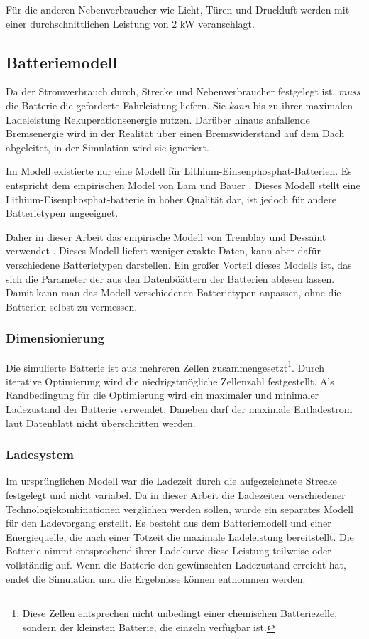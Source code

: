 Für die anderen Nebenverbraucher wie Licht, Türen und Druckluft werden mit einer durchschnittlichen Leistung von 2 kW veranschlagt.

\subsection{Batteriemodell}
Da der Stromverbrauch durch, Strecke und Nebenverbraucher festgelegt ist, \emph{muss} die Batterie die geforderte Fahrleistung liefern. Sie \emph{kann} bis zu ihrer maximalen Ladeleistung Rekuperationsenergie nutzen. Darüber hinaus anfallende Bremsenergie wird in der Realität über einen Bremswiderstand auf dem Dach abgeleitet, in der Simulation wird sie ignoriert.

Im Modell existierte nur eine Modell für Lithium-Einsenphosphat-Batterien. Es entspricht dem empirischen Model von Lam und Bauer \cite{lam2011practical}. Dieses Modell stellt eine Lithium-Eisenphosphat-batterie in hoher Qualität dar, ist jedoch für andere Batterietypen ungeeignet.

Daher in dieser Arbeit das empirische Modell von Tremblay und Dessaint verwendet \cite{tremblay2009experimental}. Dieses Modell liefert weniger exakte Daten, kann aber dafür verschiedene Batterietypen darstellen. Ein großer Vorteil dieses Modells ist, das sich die Parameter der aus den Datenböättern der Batterien ablesen lassen. Damit kann man das Modell verschiedenen Batterietypen anpassen, ohne die Batterien selbst zu vermessen.

\subsubsection{Dimensionierung}
Die simulierte Batterie ist aus mehreren Zellen zusammengesetzt\footnote{Diese Zellen entsprechen nicht unbedingt einer chemischen Batteriezelle, sondern der kleinsten Batterie, die einzeln verfügbar ist.}. Durch iterative Optimierung wird die niedrigstmögliche Zellenzahl festgestellt. Als Randbedingung für die Optimierung wird ein maximaler und minimaler Ladezustand der Batterie verwendet. Daneben darf der maximale Entladestrom laut Datenblatt nicht überschritten werden.

\subsubsection{Ladesystem}
Im ursprünglichen Modell war die Ladezeit durch die aufgezeichnete Strecke festgelegt und nicht variabel. Da in dieser Arbeit die Ladezeiten verschiedener Technologiekombinationen verglichen werden sollen, wurde ein separates Modell für den Ladevorgang erstellt. Es besteht aus dem Batteriemodell und einer Energiequelle, die nach einer Totzeit die maximale Ladeleistung bereitstellt. Die Batterie nimmt entsprechend ihrer Ladekurve diese Leistung teilweise oder vollständig auf. Wenn die Batterie den gewünschten Ladezustand erreicht hat, endet die Simulation und die Ergebnisse können entnommen werden.

